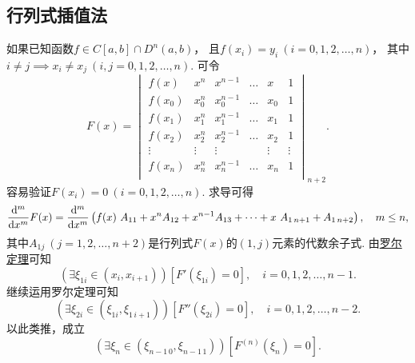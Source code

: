 \subsection{行列式插值法}
如果已知函数\(f \in C[a,b] \cap D^n(a,b)\)，
且\(f(x_i) = y_i\ (i=0,1,2,\dotsc,n)\)，
其中\(i \neq j \implies x_i \neq x_j\ (i,j=0,1,2,\dotsc,n)\).
可令\[
	F(x) = \begin{vmatrix}
		f(x) & x^n & x^{n-1} & \dots & x & 1 \\
		f(x_0) & x_0^n & x_0^{n-1} & \dots & x_0 & 1 \\
		f(x_1) & x_1^n & x_1^{n-1} & \dots & x_1 & 1 \\
		f(x_2) & x_2^n & x_2^{n-1} & \dots & x_2 & 1 \\
		\vdots & \vdots & \vdots & & \vdots & \vdots \\
		f(x_n) & x_n^n & x_n^{n-1} & \dots & x_n & 1 \\
	\end{vmatrix}_{n+2}.
\]
容易验证\(F(x_i) = 0\ (i=0,1,2,\dotsc,n)\).
求导可得\[
	\dv[m]{x} F(x)
	= \dv[m]{x} \left(
		f(x)~A_{11}
		+ x^n A_{12}
		+ x^{n-1} A_{13}
		+ \dotsb
		+ x~A_{1\,n+1}
		+ A_{1\,n+2}
	\right),
	\quad m \leq n,
\]
其中\(A_{1j}\ (j=1,2,\dotsc,n+2)\)是行列式\(F(x)\)的\((1,j)\)元素的代数余子式.
由\hyperref[theorem:微分中值定理.罗尔定理]{罗尔定理}可知\[
	(\exists\xi_{1i}\in(x_i,x_{i+1}))
	[F'(\xi_{1i}) = 0],
	\quad i=0,1,2,\dotsc,n-1.
\]
继续运用罗尔定理可知\[
	(\exists\xi_{2i}\in(\xi_{1i},\xi_{1\,i+1}))
	[F''(\xi_{2i}) = 0],
	\quad i=0,1,2,\dotsc,n-2.
\]
以此类推，成立\[
	(\exists\xi_n\in(\xi_{n-1\,0},\xi_{n-1\,1}))
	[F^{(n)}(\xi_n) = 0].
\]
